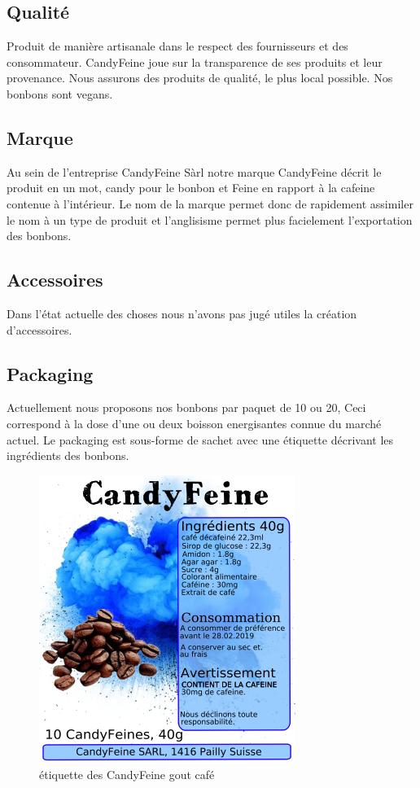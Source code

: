 \documentclass[12pt]{article}
\begin{document}
\subsection{Qualité}
Produit de manière artisanale dans le respect des fournisseurs et des consommateur.
CandyFeine joue sur la transparence de ses produits et leur provenance.
Nous assurons des produits de qualité, le plus local possible. Nos bonbons sont vegans.
\subsection{Marque}
Au sein de l'entreprise CandyFeine Sàrl notre marque CandyFeine décrit le produit en un mot, candy pour le bonbon et Feine en rapport à la cafeine contenue à l'intérieur.
Le nom de la marque permet donc de rapidement assimiler le nom à un type de produit et l'anglisisme permet plus facielement l'exportation des bonbons.

\subsection{Accessoires}
Dans l'état actuelle des choses nous n'avons pas jugé utiles la création d'accessoires.

\subsection{Packaging}
Actuellement nous proposons nos bonbons par paquet de 10 ou 20, Ceci correspond à la dose d'une ou deux boisson energisantes connue du marché actuel.
Le packaging est sous-forme de sachet avec une étiquette décrivant les ingrédients des bonbons.

\begin{figure}[H]
\centering
   \caption{\label{étiquette} étiquette des CandyFeine gout café}
   \includegraphics[scale=0.8]{../img/designEtiquettes_Cafe.png}
\end{figure}
\end{document}
